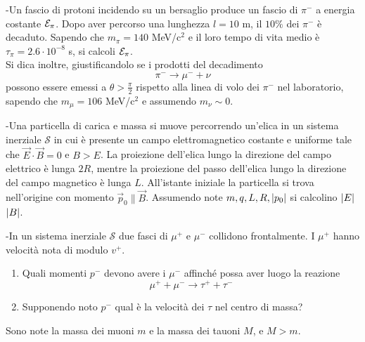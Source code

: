 \documentclass[12pt,twoside,a4]{article}
\begin{document}
\bigskip

\begin{esercizio}[Esame 18-06-2006] 
-Un fascio di protoni incidendo su un bersaglio produce un fascio di  $\pi^-$ a energia costante $\mathcal{E}_\pi$. Dopo aver percorso una lunghezza $l = 10$ m, il $10 \%$ dei $\pi^-$ è decaduto.  Sapendo che $m_\pi = 140$ MeV/c$^2$ e il loro tempo di vita medio è $\tau_\pi = 2.6 \cdot 10^{-8}$ s, si calcoli $\mathcal{E}_\pi$.
\\
Si dica inoltre, giustificandolo se i prodotti del decadimento
$$ \pi^- \longrightarrow \mu^- + \nu $$
possono essere emessi a $\theta > \frac{\pi}{2}$ rispetto alla linea di volo dei $\pi^-$
nel laboratorio, sapendo che $m_\mu = 106$ MeV/c$^2$ e assumendo $m_\nu \sim 0$.
\end{esercizio}


\begin{esercizio}[Esame 14-07-2006]
	-Una particella di carica  e  massa  si muove percorrendo un'elica in un sistema inerziale $\mathcal{S}$ in cui è presente un campo elettromagnetico costante e uniforme tale che $\vec{E} \cdot \vec{B} = 0$ e $B > E$. La proiezione dell'elica lungo la direzione del campo elettrico è lunga $2R$, mentre la proiezione del passo dell'elica lungo la direzione del campo magnetico è lunga $L$. All'istante iniziale la particella si trova nell'origine con momento $\vec{p}_0 \parallel \vec{B}$. Assumendo note $m,q,L,R, \left| {p_0} \right|$ si calcolino $\left| {E} \right|$ $\left| {B} \right|$.
\end{esercizio}



\begin{esercizio}[Esame 07-09-2006]
	-In un sistema inerziale $\mathcal{S}$ due fasci di $\mu^+$ e $\mu^-$ collidono frontalmente. I $\mu^+$ hanno velocità  nota di modulo $v^+.$
\begin{enumerate}[label=(\textit{\roman*})]
\item Quali momenti $p^-$ devono avere i $\mu^-$ affinché possa aver luogo la reazione
$$ \mu^+ + \mu^- \longrightarrow \tau^+ + \tau^-$$
\item Supponendo noto $p^-$ qual è la velocità  dei $\tau$ nel centro di massa?
\end{enumerate}
Sono note la massa dei muoni $m$ e la massa dei tauoni $M$, e $M > m$.
\end{esercizio}

\newpage
\end{document}
